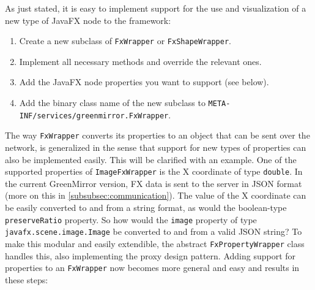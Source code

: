 \documentclass[a4paper]{article}
\begin{document}
As just stated, it is easy to implement support for the use and visualization of a new type of JavaFX node to the framework:
\begin{enumerate}
\item Create a new subclass of \lstinline{FxWrapper} or \lstinline{FxShapeWrapper}.
\item Implement all necessary methods and override the relevant ones.
\item Add the JavaFX node properties you want to support (see below).
\item Add the binary class name of the new subclass to \lstinline{META-INF/services/greenmirror.FxWrapper}.
\end{enumerate}

The way \lstinline{FxWrapper} converts its properties to an object that can be sent over the network, is generalized in the sense that support for new types of properties can also be implemented easily. This will be clarified with an example. One of the supported properties of \lstinline{ImageFxWrapper} is the X coordinate of type \lstinline{double}. In the current GreenMirror version, FX data is sent to the server in JSON format (more on this in \cref{subsubsec:communication}). The value of the X coordinate can be easily converted to and from a string format, as would the boolean-type \lstinline{preserveRatio} property. So how would the \lstinline{image} property of type \lstinline{javafx.scene.image.Image} be converted to and from a valid JSON string? To make this modular and easily extendible, the abstract \lstinline{FxPropertyWrapper} class handles this, also implementing the proxy design pattern. Adding support for properties to an \lstinline{FxWrapper} now becomes more general and easy and results in these steps:
\end{document}
